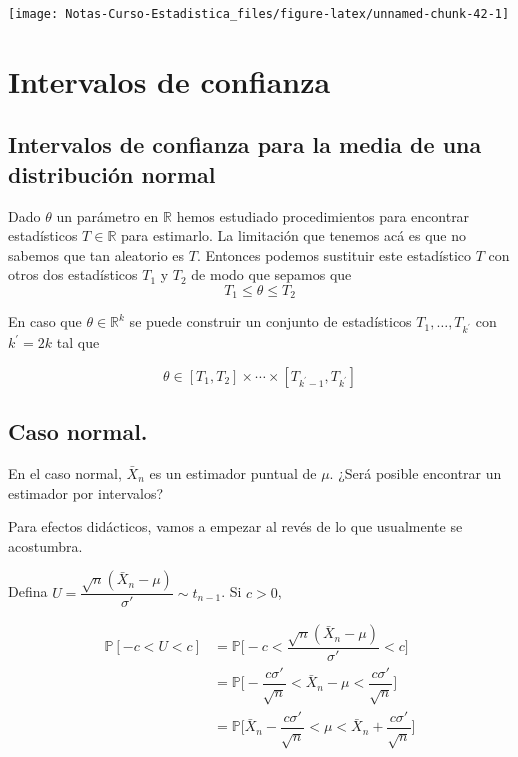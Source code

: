 \documentclass[
  12pt,
]{book}
\begin{document}
\begin{center}\texttt{[image: Notas-Curso-Estadistica\_files/figure-latex/unnamed-chunk-42-1]} \end{center}

\hypertarget{intervalos-de-confianza}{%
\chapter{Intervalos de confianza}\label{intervalos-de-confianza}}

\hypertarget{intervalos-de-confianza-para-la-media-de-una-distribuciuxf3n-normal}{%
\section{Intervalos de confianza para la media de una distribución normal}\label{intervalos-de-confianza-para-la-media-de-una-distribuciuxf3n-normal}}

Dado \(\theta\) un parámetro en \(\mathbb{R}\) hemos estudiado procedimientos para
encontrar estadísticos \(T\in \mathbb R\) para estimarlo. La limitación que
tenemos acá es que no sabemos que tan aleatorio es \(T\). Entonces podemos
sustituir este estadístico \(T\) con otros dos estadísticos \(T_1\) y \(T_2\)
de modo que sepamos que
\begin{equation*}
T_1 \leq \theta \leq T_2
\end{equation*}

En caso que \(\theta \in \mathbb{R} ^{k}\) se puede construir un conjunto de
estadísticos \(T_1, \ldots, T_{k^\prime}\) con \(k^\prime = 2k\) tal que

\begin{equation*}
\theta \in [T_1, T_2] \times \cdots \times [T_{k^\prime-1}, T_{k^\prime}]
\end{equation*}

\hypertarget{caso-normal.}{%
\section{Caso normal.}\label{caso-normal.}}

En el caso normal, \(\bar X_n\) es un estimador puntual de \(\mu\). ¿Será posible
encontrar un estimador por intervalos?

Para efectos didácticos, vamos a empezar al revés de lo que usualmente se
acostumbra.

Defina \(U = \dfrac{\sqrt{n}(\bar X_n-\mu)}{\sigma'} \sim t_{n-1}\). Si \(c>0\),

\begin{align*} 
\mathbb P[-c<U<c] & = \mathbb P \bigg[ -c<\dfrac{\sqrt{n}(\bar
X_n-\mu)}{\sigma'} <c\bigg]\\ & = \mathbb P \bigg[-\dfrac{c\sigma'}{\sqrt n} <
\bar X_n - \mu <\dfrac{c\sigma'}{\sqrt n}\bigg] \\ & = \mathbb P \bigg[ \bar X_n
-\dfrac{c\sigma'}{\sqrt n} < \mu < \bar X_n + \dfrac{c\sigma'}{\sqrt n}\bigg]
\end{align*}
\end{document}
